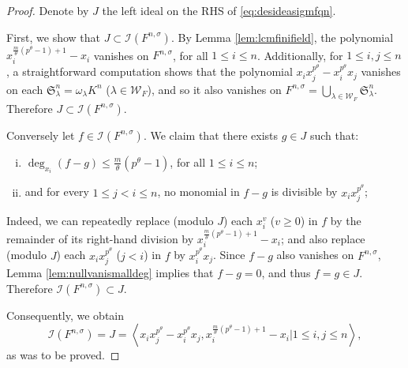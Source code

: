 \documentclass[11pt,reqno]{amsart}
\theoremstyle{definition}
\begin{document}
\begin{proof}
Denote by $J$ the left ideal on the RHS of \eqref{eq:desideasigmfqn}. 

First, we show that $J \subset \mathscr{I}(F^{n,\sigma})$. By Lemma \ref{lem:lcmfinifield}, the polynomial $x_i^{\frac{m}{\theta}(p^\theta-1)+1}-x_i$ vanishes on $F^{n,\sigma}$, for all $1 \leq i \leq n$. Additionally, for $1 \leq i,j \leq n$, a straightforward computation shows that the polynomial $x_ix_j^{p^\theta}-x_i^{p^\theta}x_j$ vanishes on each $\mathfrak{S}_{\lambda}^{n}=\omega_\lambda K^n$ ($\lambda  \in \mathscr{W}_{F}$), and so it also vanishes on $F^{n,\sigma}=\bigcup_{\lambda \in \mathscr{W}_F}\mathfrak{S}_{\lambda}^n$. Therefore $J \subset \mathscr{I}(F^{n,\sigma})$.

Conversely let $f \in \mathscr{I}(F^{n,\sigma})$. We claim that there exists $g \in J$ such that: 
\begin{enumerate}[i)]
\item
$\deg_{x_{i}}(f-g) \leq \frac{m}{\theta}(p^\theta-1)$, for all $1 \leq i \leq n$;
\item
and for every $1 \leq j < i \leq n$, no monomial in $f-g$ is divisible by $x_ix_j^{p^\theta}$;
\end{enumerate}
Indeed, we can repeatedly replace (modulo $J$) each $x_i^v$ ($v \geq 0$) in $f$ by the remainder of its right-hand division by $x_i^{\frac{m}{\theta}(p^\theta-1)+1}-x_i$; and also replace (modulo $J$) each $x_ix_j^{p^\theta}$ ($j < i$) in $f$ by $x_i^{p^\theta}x_j$. Since $f-g$ also vanishes on $F^{n,\sigma}$, Lemma \ref{lem:nullvanismalldeg} implies that $f-g=0$, and thus $f=g \in J$. Therefore $\mathscr{I}(F^{n,\sigma}) \subset J$.

Consequently, we obtain 
$$\mathscr{I}(F^{n,\sigma})=J=\left\langle x_ix_j^{p^\theta}-x_i^{p^\theta}x_j, x_i^{\frac{m}{\theta}(p^\theta-1)+1}-x_i \bigg\vert 1 \leq i,j \leq n \right\rangle,
$$ as was to be proved.
\end{proof}
\end{document}
